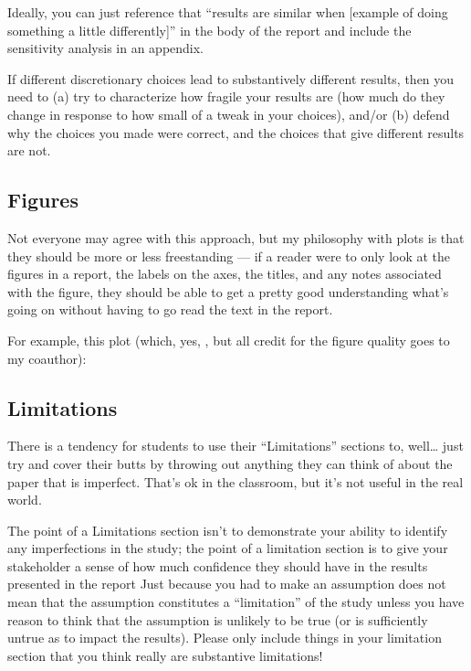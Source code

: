 \documentclass[letterpaper,10pt,english]{jupyterBook}
\begin{document}
\sphinxAtStartPar
Ideally, you can just reference that “results are similar when {[}example of doing something a little differently{]}” in the body of the report and include the sensitivity analysis in an appendix.

\sphinxAtStartPar
If different discretionary choices  lead to substantively different results, then you need to (a) try to characterize how fragile your results are (how much do they change in response to how small of a tweak in your choices), and/or (b) defend why the choices you made were correct, and the choices that give different results are not.


\subsection{Figures}
\label{\detokenize{40_in_practice/25_writing_to_stakeholders:figures}}
\sphinxAtStartPar
Not everyone may agree with this approach, but my philosophy with plots is that they should be more or less freestanding — if a reader were to only look at the figures in a report, the labels on the axes, the titles, and any notes associated with the figure, they should be able to get a pretty good understanding what’s going on without having to go read the text in the report.

\sphinxAtStartPar
For example, this plot (which, yes, , but all credit for the figure quality goes to my coauthor):

\sphinxAtStartPar
{}


\subsection{Limitations}
\label{\detokenize{40_in_practice/25_writing_to_stakeholders:limitations}}
\sphinxAtStartPar
There is a tendency for students to use their “Limitations” sections to, well… just try and cover their butts by throwing out anything they can think of about the paper that is imperfect. That’s ok in the classroom, but it’s not useful in the real world.

\sphinxAtStartPar
The point of a Limitations section isn’t to demonstrate your ability to identify any imperfections in the study; the point of a limitation section is to give your stakeholder a sense of how much confidence they should have in the results presented in the report  Just because you had to make an assumption does not mean that the assumption constitutes a “limitation” of the study unless you have reason to think that the assumption is unlikely to be true (or is sufficiently untrue as to impact the results). Please only include things in your limitation section that you think really are substantive limitations!
\end{document}
